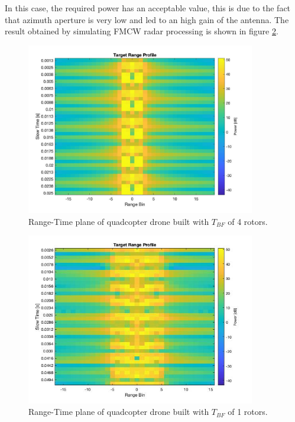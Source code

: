 In this case, the required power has an acceptable value, this is due to the fact that azimuth aperture is very low and led to an high gain of the antenna. The result obtained by simulating FMCW radar processing is shown in figure \ref{rangetime_map_quad}.

\begin{figure}[h!]
\centering
\includegraphics[width=10cm]{FMCW mD analysis-chap4/img/quad_range_var_no_good.jpg}
\caption{Range-Time plane of quadcopter drone built with $T_{BF}$ of 4 rotors.}
\label{rangetime_map_quad_4rot}
\end{figure}

\begin{figure}[h!]
\centering
\includegraphics[width=10cm]{FMCW mD analysis-chap4/img/quadcopter_range_profile.jpg}
\caption{Range-Time plane of quadcopter drone built with $T_{BF}$ of 1 rotors.}
\label{rangetime_map_quad}
\end{figure}

